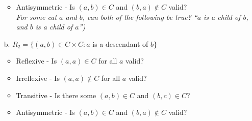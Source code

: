 \documentclass[a4paper,12pt]{book}
\newcounter{question}
\begin{document}
\begin{questionNOGRADE}{\thequestion}
\begin{itemize}
\begin{itemize}
                    \item   Antisymmetric - Is $(a,b) \in C$ and $(b,a) \not\in C$ valid?
                            \\ \textit{For some cat $a$ and $b$, can both of the following be true? ``$a$ is a child of $b$, and $b$ is a child of $a$'')}
                \end{itemize}

        \newpage

            \item[b.]   $R_{2} = \{ (a, b) \in C \times C : a$ is a descendant of $b \}$

                \begin{itemize}
                    \item   Reflexive - Is $(a,a) \in C$ for all $a$ valid?

                    \item   Irreflexive - Is $(a,a) \not\in C$ for all $a$ valid?

                    \item   Transitive - Is there some $(a,b) \in C$ and $(b,c) \in C$?

                    \item   Antisymmetric - Is $(a,b) \in C$ and $(b,a) \not\in C$ valid?
                \end{itemize}
        \end{itemize}


    \end{questionNOGRADE}
\end{document}
